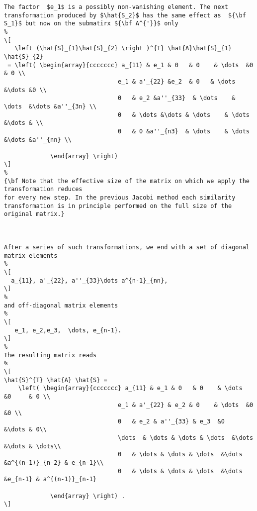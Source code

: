 {\begin{lstlisting}
The factor  $e_1$ is a possibly non-vanishing element. The next
transformation produced by $\hat{S_2}$ has the same effect as  ${\bf
S_1}$ but now on the submatirx ${\bf A^{'}}$ only
%
\[
   \left (\hat{S}_{1}\hat{S}_{2} \right )^{T} \hat{A}\hat{S}_{1} \hat{S}_{2}
 = \left( \begin{array}{ccccccc} a_{11} & e_1 & 0   & 0    & \dots  &0     & 0 \\
                                e_1 & a'_{22} &e_2  & 0   & \dots  &\dots &0 \\
                                0   & e_2 &a''_{33}  & \dots    & \dots  &\dots &a''_{3n} \\
                                0   & \dots &\dots & \dots    & \dots  &\dots & \\
                                0   & 0 &a''_{n3}  & \dots    & \dots  &\dots &a''_{nn} \\

             \end{array} \right) 
\]
%
{\bf Note that the effective size of the matrix on which we apply the transformation reduces
for every new step. In the previous Jacobi method each similarity
transformation is in principle performed on the full size of the original matrix.}



After a series of such transformations, we end with a set of diagonal
matrix elements
%
\[
  a_{11}, a'_{22}, a''_{33}\dots a^{n-1}_{nn},
\]
%
and off-diagonal matrix elements 
%
\[
   e_1, e_2,e_3,  \dots, e_{n-1}.
\]
%
The resulting matrix reads
%
\[
\hat{S}^{T} \hat{A} \hat{S} = 
    \left( \begin{array}{ccccccc} a_{11} & e_1 & 0   & 0    & \dots  &0     & 0 \\
                                e_1 & a'_{22} & e_2 & 0    & \dots  &0     &0 \\
                                0   & e_2 & a''_{33} & e_3  &0       &\dots & 0\\
                                \dots  & \dots & \dots & \dots  &\dots      &\dots & \dots\\
                                0   & \dots & \dots & \dots  &\dots       &a^{(n-1)}_{n-2} & e_{n-1}\\
                                0   & \dots & \dots & \dots  &\dots       &e_{n-1} & a^{(n-1)}_{n-1}

             \end{array} \right) .
\]


\end{lstlisting}}
